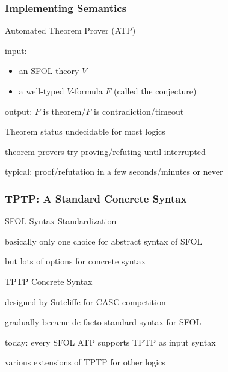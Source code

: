 \begin{frame}\frametitle{Implementing Semantics}
\begin{blockitems}{Automated Theorem Prover (ATP)}
\item input:
 \begin{itemize}
 \item an SFOL-theory $V$
 \item a well-typed $V$-formula $F$ (called the conjecture)
 \end{itemize}
\item output: $F$ is theorem/$F$ is contradiction/timeout
\end{blockitems}

\begin{blockitems}{Theorem status undecidable for most logics}
\item theorem provers try proving/refuting until interrupted
\item typical: proof/refutation in a few seconds/minutes or never
\end{blockitems}

\end{frame}

\begin{frame}\frametitle{TPTP: A Standard Concrete Syntax}
\begin{blockitems}{SFOL Syntax Standardization}
\item basically only one choice for abstract syntax of SFOL
\item but lots of options for concrete syntax
\end{blockitems}

\begin{blockitems}{TPTP Concrete Syntax}
\item designed by Sutcliffe for CASC competition
\item gradually became de facto standard syntax for SFOL
\item today: every SFOL ATP supports TPTP as input syntax
\item various extensions of TPTP for other logics
\end{blockitems}

\end{frame}

